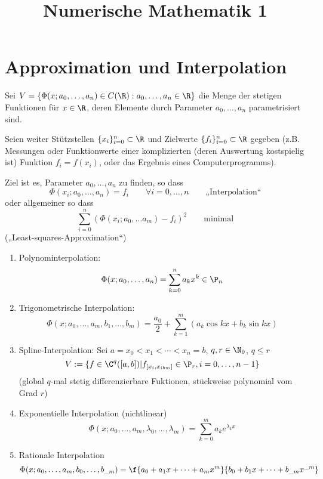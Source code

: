 \documentclass[11pt]{scrbook}
\title{Numerische Mathematik 1}
\author{}
\begin{document}
\maketitle

\tableofcontents
\newpage

\chapter{Approximation und Interpolation}

Sei $V= \{\Phi(x;a_0,\dotsc, a_n) \in C(\R) : a_0,\dotsc,a_n\in \R\}$ die Menge der stetigen Funktionen für $x\in \R$, deren Elemente durch Parameter $a_0,\dotsc,a_n$ parametrisiert sind.

Seien weiter Stützstellen $\{x_i\}_{i=0}^n\subset \R$ und Zielwerte $\{f_i\}_{i=0}^n \subset \R$ gegeben (z.B. Messungen oder Funktionwerte einer komplizierten (deren Auswertung kostspielig ist) Funktion $f_i=f(x_i)$, oder das Ergebnis eines Computerprogramms).

Ziel ist es, Parameter $a_0,\dotsc, a_n$ zu finden, so dass
\[
	\Phi(x_i;a_0,\dotsc, a_n) = f_i \qquad \forall i= 0,\dotsc,n \qquad \text{„Interpolation“}
\]
oder allgemeiner so dass
\[
	\sum_{i=0}^n(\Phi(x_i; a_0,\dotsc a_m) -f_i)^2 \qquad \text{minimal}
\]
(„Least-squares-Approximation“)

\begin{ex*}
	\begin{enumerate}
		\item 
			Polynominterpolation:
			\[
				\Phi(x; a_0,\dotsc, a_n) = \sum_{k=0}^na_kx^k \in \P_n
			\]
		\item
			Trigonometrische Interpolation:
			\[
				\Phi ( x;a_0,\dots,a_m,b_1,\dots, b_m ) = \frac{a_{0}}{2} + \sum_{k=1}^m ( a_k \cos kx + b_k \sin kx )
			\]
		\item
			Spline-Interpolation:
			Sei $a=x_0< x_1 < \dotsb < x_n = b$, $q,r\in \N_0$, $q\le r$
			\[
			V := \{f\in \C^q([a,b]) | f_{[x_i,x_{ibm}]}\in \P_r, i=0,\dotsc,n-1\}
			\]
			(global $q$-mal stetig differenzierbare Fuktionen, stückweise polynomial vom Grad $r$)
		\item
			Exponentielle Interpolation (nichtlinear)
			\[
			\Phi(x;a_0,\dotsc, a_m,\lambda_0,\dotsc, \lambda_m) = \sum_{k=0}^m a_ke^{\lambda_k x}
			\]
		\item
			Rationale Interpolation
			\[
				\Phi(x; a_0,\dotsc, a_m, b_0,\dotsc, b_{\_m}) = \f {a_0 + a_1x + \dotsb + a_m x^m}{b_0 + b_1x + \dotsb + b_{\_m}x^{\_m}}
			\]
	\end{enumerate}
\end{ex*}
\end{document}
